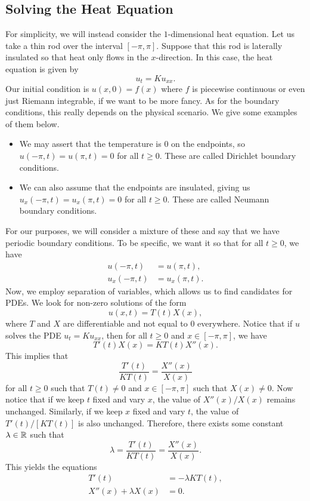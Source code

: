 \subsection{Solving the Heat Equation}
For simplicity, we will instead consider the $1$-dimensional heat equation. 
Let us take a thin rod over the interval $[-\pi, \pi]$. Suppose that this 
rod is laterally insulated so that heat only flows in the $x$-direction. 
In this case, the heat equation is given by 
\[ u_t = K u_{xx}. \] 
Our initial condition is $u(x, 0) = f(x)$ where $f$ is piecewise continuous
or even just Riemann integrable, if we want to be more fancy. As for the 
boundary conditions, this really depends on the physical scenario. We give 
some examples of them below.
\begin{itemize}
    \item We may assert that the temperature is $0$ on the endpoints, so
    $u(-\pi, t) = u(\pi, t) = 0$ for all $t \geq 0$. These are called 
    Dirichlet boundary conditions.
    \item We can also assume that the endpoints are insulated, giving us 
    $u_x(-\pi, t) = u_x(\pi, t) = 0$ for all $t \geq 0$. These are called 
    Neumann boundary conditions.
\end{itemize}
For our purposes, we will consider a mixture of these and say that we have 
periodic boundary conditions. To be specific, we want it so that for all 
$t \geq 0$, we have 
\begin{align*}
    u(-\pi, t) &= u(\pi, t), \\ 
    u_x(-\pi, t) &= u_x(\pi, t).
\end{align*}
Now, we employ separation of variables, which allows us to find candidates for
PDEs. We look for non-zero solutions of the form 
\[ u(x, t) = T(t) X(x), \] 
where $T$ and $X$ are differentiable and not equal to $0$ everywhere. 
Notice that if $u$ solves the PDE $u_t = Ku_{xx}$, then for all 
$t \geq 0$ and $x \in [-\pi, \pi]$, we have 
\[ T'(t)X(x) = KT(t)X''(x). \] 
This implies that 
\[ \frac{T'(t)}{KT(t)} = \frac{X''(x)}{X(x)} \] 
for all $t \geq 0$ such that $T(t) \neq 0$ and $x \in [-\pi, \pi]$ such that 
$X(x) \neq 0$. Now notice that if we keep $t$ fixed and vary $x$, the value 
of $X''(x)/X(x)$ remains unchanged. Similarly, if we keep $x$ fixed and 
vary $t$, the value of $T'(t)/[KT(t)]$ is also unchanged. Therefore, 
there exists some constant $\lambda \in \mathbb{R}$ such that 
\[ \lambda = \frac{T'(t)}{KT(t)} = \frac{X''(x)}{X(x)}. \] 
This yields the equations
\begin{align}
    T'(t) &= -\lambda KT(t), \label{eq:1.3} \\ 
    X''(x) + \lambda X(x) &= 0. \label{eq:1.4}
\end{align}
